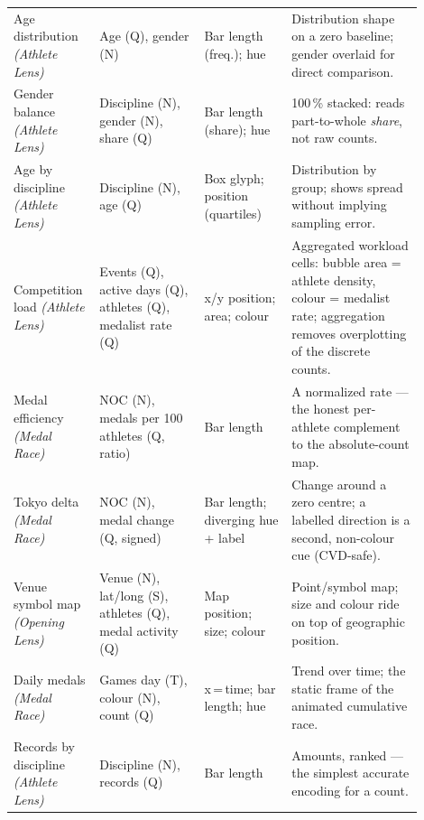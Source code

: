 \documentclass[11pt]{article}
\begin{document}
{\begin{longtable}{@{}p{0.155\linewidth} p{0.245\linewidth} p{0.20\linewidth} p{0.30\linewidth}@{}}
Age distribution \emph{(Athlete Lens)} & Age (Q), gender (N) & Bar length (freq.); hue & Distribution shape on a zero baseline; gender overlaid for direct comparison. \\
Gender balance \emph{(Athlete Lens)} & Discipline (N), gender (N), share (Q) & Bar length (share); hue & 100\,\% stacked: reads part-to-whole \emph{share}, not raw counts. \\
Age by discipline \emph{(Athlete Lens)} & Discipline (N), age (Q) & Box glyph; position (quartiles) & Distribution by group; shows spread without implying sampling error. \\
Competition load \emph{(Athlete Lens)} & Events (Q), active days (Q), athletes (Q), medalist rate (Q) & x/y position; area; colour & Aggregated workload cells: bubble area = athlete density, colour = medalist rate; aggregation removes overplotting of the discrete counts. \\
Medal efficiency \emph{(Medal Race)} & NOC (N), medals per 100 athletes (Q, ratio) & Bar length & A normalized rate --- the honest per-athlete complement to the absolute-count map. \\
Tokyo delta \emph{(Medal Race)} & NOC (N), medal change (Q, signed) & Bar length; diverging hue + label & Change around a zero centre; a labelled direction is a second, non-colour cue (CVD-safe). \\
Venue symbol map \emph{(Opening Lens)} & Venue (N), lat/long (S), athletes (Q), medal activity (Q) & Map position; size; colour & Point/symbol map; size and colour ride on top of geographic position. \\
Daily medals \emph{(Medal Race)} & Games day (T), colour (N), count (Q) & x\,=\,time; bar length; hue & Trend over time; the static frame of the animated cumulative race. \\
Records by discipline \emph{(Athlete Lens)} & Discipline (N), records (Q) & Bar length & Amounts, ranked --- the simplest accurate encoding for a count. \\
\end{longtable}
}

\end{document}
